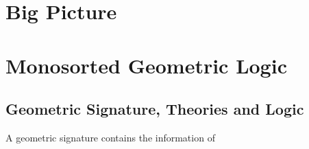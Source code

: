 %


\chapter{Big Picture}

\chapter{Monosorted Geometric Logic}
\section{Geometric Signature, Theories and Logic}

\begin{definition}
A geometric signature contains the information of 
\end{definition}


\newcommand{\thT}{\ensuremath{\mathcal{T}}}
\newcommand{\fmlInCtx}[2]{\{ #1 | #2 \}}
\newcommand{\subs}[2]{{#1}[{#1}]}
\newcommand{\Univ}{\ensuremath{\mathscr{U}}}
\newcommand{\quot}{\text{quot}}
\newcommand{\vxz}{\vec{x}+\vec{z}}
\newcommand{\vw}{\vec{w}}
\newcommand{\vx}{\vec{x}}
\newcommand{\vy}{\vec{y}}
\newcommand{\vz}{\vec{z}}
\newcommand{\iotas}{\ensuremath{[\iota_1,\iota_2]}}
\newcommand{\xphi}{\vec{x}\mid\phi}
\newcommand{\ypsi}{\vec{y}\mid\psi}
\newcommand{\zzeta}{\vec{z}\mid\zeta}
\newcommand{\ophi}{\overline{\phi}}
\newcommand{\opsi}{\overline{\psi}}
\newcommand{\ozeta}{\overline{\zeta}}
\newcommand{\inl}{\mathsf{inl}}
\newcommand{\inr}{\mathsf{inr}}

